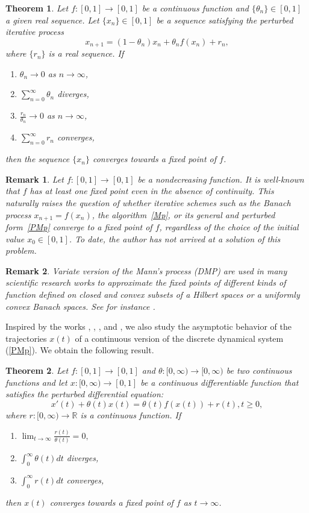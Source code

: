 \documentclass[11pt]{amsart}%
\theoremstyle{plain}
\numberwithin{equation}{section}
\newtheorem{theorem}{Theorem}[section]
\newtheorem{remark}{Remark}[section]
\begin{document}
\begin{theorem}
\label{Th1}
Let $f:[0,1]\to [0,1]$ be a continuous function and $\{\theta_n\}\in[0,1]$ a given real sequence. Let  $\{x_{n}\}\in[0,1]$ be a sequence satisfying the perturbed iterative process
\begin{equation}
\label{PMp}
  x_{n+1}=(1-\theta_n) x_n+\theta_n f(x_n)+r_n,
\end{equation}
where $\{r_n\}$ is a real sequence. If
\begin{enumerate}
  \item $\theta _{n}\rightarrow 0$ as $n\rightarrow \infty $,
  \item $\sum_{n=0}^{\infty }\theta _{n}$ diverges,
  \item $\frac{r_{n}}{\theta _{n}}\rightarrow 0$ as $n\rightarrow
\infty $,
\item $\sum_{n=0}^{\infty }r_{n}$ converges,
\end{enumerate}
then the sequence $\{x_{n}\}$ converges towards a fixed point of $f$.
\end{theorem}
\begin{remark}
Let $f:[0,1]\to [0,1]$ be a nondecreasing function. It is well-known that $f$ has at least one fixed point even in the absence of continuity. This naturally raises the question of whether iterative schemes such as the Banach process $ x_{n+1} = f(x_n)$, the algorithm~\eqref{Mp}, or its general and perturbed form~\eqref{PMp} converge to a fixed point of $f $, regardless of the choice of the initial value $x_0 \in [0,1]$. To date, the author has not arrived at a solution of this problem.
\end{remark}
\begin{remark}
Variate version of the Mann's process (DMP) are used in many scientific research works to approximate the fixed points of different kinds of function defined on closed and convex subsets of a Hilbert spaces or a uniformly convex Banach spaces. See for instance \cite{Halp,Kri,Mou,Rei,Xu}.
\end{remark}
Inspired by the works \cite{JH}, \cite{Hal}, \cite{Har}, \cite{May} and \cite{SBC}, we also study the asymptotic behavior of the trajectories $x(t)$  of a continuous version
of the discrete dynamical system (\ref{PMp}). We obtain the following result.
\begin{theorem}
\label{Th2}
Let $f:[0,1]\to [0,1]$ and $\theta:[0,\infty)\to [0,\infty)$ be two continuous functions and let $x:[0,\infty)\to [0,1]$ be a continuous differentiable function that satisfies  the perturbed differential equation:
\begin{equation}
\label{CMp}
  x'(t)+\theta(t)x(t)=\theta(t)f(x(t))+r(t), t\geq0,
\end{equation}
where $r:[0,\infty)\to \mathbb{R} $ is a continuous function. If
\begin{enumerate}
  \item $\lim_{t\rightarrow \infty }\frac{r(t)}{\theta (t)}=0,$
  \item $\int_{0}^{\infty }\theta (t)dt$ diverges,
  \item $\int_{0}^{\infty }r(t)dt$ converges,
\end{enumerate}
then  $x(t)$ converges towards a fixed point of $f$ as $t\rightarrow\infty$.
\end{theorem}
\end{document}
